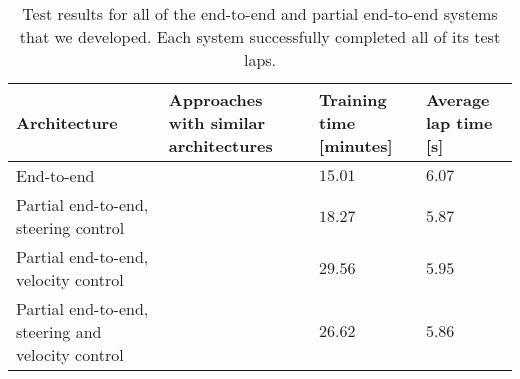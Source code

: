 
\begin{table}[!htb]
\centering
\renewcommand{\arraystretch}{1.5}
\small
\begin{tabularx}{\textwidth}{RMLL} 
    \hline
    \textbf{Architecture} & \textbf{Approaches with similar architectures} & \textbf{Training time [minutes]} & \textbf{Average lap time [s]}\\ 
    \hline
    End-to-end                                          &  
    \cite{Song2021, Wadekar2021, Fuchs2021, Ivanov2020, Williams2017, Pan2017a, Perot2017, Jaritz2018, Niu2020, hsu2022, Chisari2021, brunnbauer2021, Remonda2021}                                                                                        & $15.01$    & $6.07$  \\     
    Partial end-to-end, steering control                &  \cite{Weiss2020a, Weiss2020}                 & $18.27$    & $5.87$  \\      
    Partial end-to-end, velocity control                & \cite{Ghignone2022, Evans2021b, Evans2021a}   & $29.56$    & $5.95$  \\
    Partial end-to-end, steering and velocity control   & \cite{Capo2020, Moghadam2020}                 & $26.62$    & $5.86$  \\
    \hline
\end{tabularx}
\caption[Test results for all of the end-to-end and partial end-to-end systems]{Test results for all of the end-to-end and partial end-to-end systems that we developed. Each system successfully completed all of its test laps.}
\label{tab:steer_vel_test_table}
\end{table}
